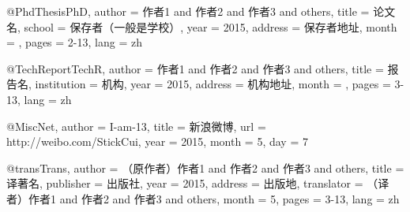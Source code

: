 @PhdThesis{PhD,
author = {作者1 and 作者2 and 作者3 and others},
title = {论文名},
school = {保存者（一般是学校）},
year = {2015},
address = {保存者地址},
month = {},
pages = {2-13},
lang = {zh}
}

@TechReport{TechR,
author = {作者1 and 作者2 and 作者3 and others},
title = {报告名},
institution = {机构},
year = {2015},
address = {机构地址},
month = {},
pages = {3-13},
lang = {zh}
}

@Misc{Net,
author = {{I-am-13}},
title = {新浪微博},
url = {http://weibo.com/StickCui},
year = {2015},
month = {5},
day = {7}
}

@trans{Trans,
author = {（原作者）作者1 and 作者2 and 作者3 and others},
title = {译著名},
publisher = {出版社},
year = {2015},
address = {出版地},
translator = {（译者）作者1 and 作者2 and 作者3 and others},
month = {5},
pages = {3-13},
lang = {zh}
}
